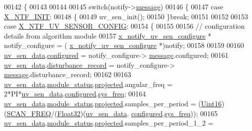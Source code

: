 \begin{DoxyCode}
00142 \{
00143 
00144 
00145     \textcolor{keywordflow}{switch}(notify->\hyperlink{a00036_adf9665938515a20c283eea2c978cf80d}{message})
00146     \{
00147         \textcolor{keywordflow}{case} \hyperlink{a00036_a620b808f2d7b8d2a03c4d026a4c5423c}{X\_NTF\_INIT}:
00148         \{
00149             uv\_sen\_init();
00150         \}\textcolor{keywordflow}{break};
00151 
00152 
00153         \textcolor{keywordflow}{case} \hyperlink{a00020_a08b676499fdf9649e575ed49e9197e13}{X\_NTF\_UV\_SENSOR\_CONFIG}:
00154         \{
00155 
00156             \textcolor{comment}{// configuration details from algorithm module}
00157             \hyperlink{a00020_dd/db2/a00866}{x\_notify\_uv\_sen\_configure} * notify\_configure = (
      \hyperlink{a00020_dd/db2/a00866}{x\_notify\_uv\_sen\_configure} *)notify;
00158 
00159 
00160             \hyperlink{a00073_adb4cffe9b88704fe686a94fe9996fa52}{uv\_sen\_data}.\hyperlink{a00035_a94b2d1f6ea4ab334c74d24984dd27843}{configured} = notify\_configure->
      \hyperlink{a00020_a1497b20cf78cad9e85b8ed48a9aa7bd2}{message}.configured;
00161             \hyperlink{a00073_adb4cffe9b88704fe686a94fe9996fa52}{uv\_sen\_data}.\hyperlink{a00035_ac9b38e2c1d3f1013a88d33506c754152}{disturbance\_record} = notify\_configure->
      \hyperlink{a00020_a1497b20cf78cad9e85b8ed48a9aa7bd2}{message}.disturbance\_record;
00162 
00163            \hyperlink{a00073_adb4cffe9b88704fe686a94fe9996fa52}{uv\_sen\_data}.\hyperlink{a00035_a5a53c391562b059eb744ac679f3765ca}{module\_status}.\hyperlink{a00017_a6b2516d74583418cec324c50041421c9}{projected}.angular\_freq             = 
      2*PI*\hyperlink{a00073_adb4cffe9b88704fe686a94fe9996fa52}{uv\_sen\_data}.\hyperlink{a00035_a94b2d1f6ea4ab334c74d24984dd27843}{configured}.\hyperlink{a00021_aa57be45aa1320405a885474010159c9e}{sys\_freq};
00164            \hyperlink{a00073_adb4cffe9b88704fe686a94fe9996fa52}{uv\_sen\_data}.\hyperlink{a00035_a5a53c391562b059eb744ac679f3765ca}{module\_status}.\hyperlink{a00017_a6b2516d74583418cec324c50041421c9}{projected}.samples\_per\_period       = 
      (\hyperlink{a00072_a59a9f6be4562c327cbfb4f7e8e18f08b}{Uint16})(\hyperlink{a00021_a8127170b687c1f67a968886c128e76e4}{SCAN\_FREQ}/(\hyperlink{a00072_a87d38f886e617ced2698fc55afa07637}{Float32})(\hyperlink{a00073_adb4cffe9b88704fe686a94fe9996fa52}{uv\_sen\_data}.
      \hyperlink{a00035_a94b2d1f6ea4ab334c74d24984dd27843}{configured}.\hyperlink{a00021_aa57be45aa1320405a885474010159c9e}{sys\_freq}));
00165            \hyperlink{a00073_adb4cffe9b88704fe686a94fe9996fa52}{uv\_sen\_data}.\hyperlink{a00035_a5a53c391562b059eb744ac679f3765ca}{module\_status}.\hyperlink{a00017_a6b2516d74583418cec324c50041421c9}{projected}.samples\_per\_period\_1\_2  = 

\end{DoxyCode}
